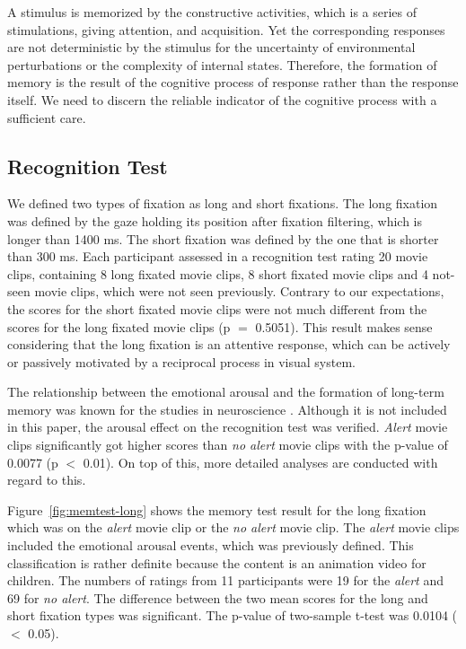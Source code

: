 \documentclass[10pt,letterpaper]{article}
\begin{document}
A stimulus is memorized by the constructive activities, which is a series of stimulations, giving attention, and acquisition. Yet the corresponding responses are not deterministic by the stimulus for the uncertainty of environmental perturbations or the complexity of internal states. Therefore, the formation of memory is the result of the cognitive process of response rather than the response itself. We need to discern the reliable indicator of the cognitive process with a sufficient care.


\subsection{Recognition Test}

We defined two types of fixation as long and short fixations. The long fixation was defined by the gaze holding its position after fixation filtering, which is longer than 1400 ms. The short fixation was defined by the one that is shorter than 300 ms. Each participant assessed in a recognition test rating 20 movie clips, containing 8 long fixated movie clips, 8 short fixated movie clips and 4 not-seen movie clips, which were not seen previously. Contrary to our expectations, the scores for the short fixated movie clips were not much different from the scores for the long fixated movie clips (p $=$ 0.5051). This result makes sense considering that the long fixation is an attentive response, which can be actively or passively motivated by a reciprocal process in visual system.

The relationship between the emotional arousal and the formation of long-term memory was known for the studies in neuroscience \cite{Cahill1996amyg,Cahill1998baso}. Although it is not included in this paper, the arousal effect on the recognition test was verified. \textit{Alert} movie clips significantly got higher scores than \textit{no alert} movie clips with the p-value of 0.0077 (p $<$ 0.01). On top of this, more detailed analyses are conducted with regard to this.

Figure~\ref{fig:memtest-long} shows the memory test result for the long fixation which was on the \textit{alert} movie clip or the \textit{no alert} movie clip. The \textit{alert} movie clips included the emotional arousal events, which was previously defined. This classification is rather definite because the content is an animation video for children. The numbers of ratings from 11 participants were 19 for the \textit{alert} and 69 for \textit{no alert}. The difference between the two mean scores for the long and short fixation types was significant. The p-value of two-sample t-test was 0.0104 ($<$ 0.05).
\end{document}
